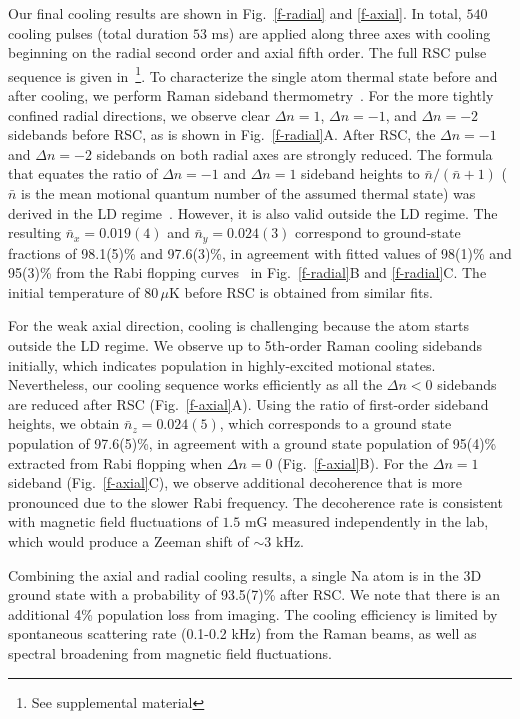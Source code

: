 \documentclass[aps,prl,twocolumn,groupedaddress]{revtex4-1}
\begin{document}
Our final cooling results are shown in Fig.~\ref{f-radial} and \ref{f-axial}.
In total, $540$ cooling pulses (total duration $53$ ms) are applied
along three axes with cooling beginning on the radial second order and axial fifth order.
The full RSC pulse sequence is given in~\footnote{See supplemental material}.
To characterize the single atom thermal state before and after cooling,
we perform Raman sideband thermometry~\cite{Monroe1995, Meekhof1996}.
For the more tightly confined radial directions,
we observe clear $\Delta n=1$, $\Delta n=-1$, and $\Delta n=-2$ sidebands before RSC,
as is shown in Fig.~\ref{f-radial}A.
After RSC, the $\Delta n=-1$ and $\Delta n=-2$ sidebands on both radial axes are strongly reduced.
The formula that equates the ratio of $\Delta n=-1$ and $\Delta n=1$ sideband heights to
$\bar{n}/(\bar{n}+1)$ ($\bar{n}$ is the mean motional quantum number of the assumed thermal state)
was derived in the LD regime~\cite{Monroe1995}.
However, it is also valid outside the LD regime.
The resulting $\bar{n}_x=0.019(4)$ and $\bar{n}_y=0.024(3)$ correspond to
ground-state fractions of 98.1(5)\% and 97.6(3)\%,
in agreement with fitted values of 98(1)\% and 95(3)\%
from the Rabi flopping curves~\cite{Meekhof1996} in Fig.~\ref{f-radial}B and \ref{f-radial}C.
The initial temperature of $80\,\mu$K before RSC is obtained from similar fits.

For the weak axial direction, cooling is challenging because the atom starts outside the LD regime.
We observe up to 5th-order Raman cooling sidebands initially,
which indicates population in highly-excited motional states.
Nevertheless, our cooling sequence works efficiently as all the $\Delta n<0$ sidebands are reduced
after RSC (Fig.~\ref{f-axial}A).
Using the ratio of first-order sideband heights, we obtain $\bar{n}_z=0.024(5)$,
which corresponds to a ground state population of
97.6(5)\%, in agreement with a ground state population of 95(4)\% extracted from Rabi flopping
when $\Delta n=0$ (Fig.~\ref{f-axial}B).
For the $\Delta n=1$ sideband (Fig.~\ref{f-axial}C),
we observe additional decoherence that is more pronounced due to the slower Rabi frequency.
The decoherence rate is consistent with magnetic field fluctuations of $1.5$ mG
measured independently in the lab, which would produce a Zeeman shift of $\sim 3$ kHz.

Combining the axial and radial cooling results,
a single Na atom is in the 3D ground state with a probability of 93.5(7)\% after RSC.
We note that there is an additional 4\% population loss from imaging.
The cooling efficiency is limited by spontaneous scattering rate
(0.1-0.2 kHz) from the Raman beams,
as well as spectral broadening from magnetic field fluctuations.
\end{document}
